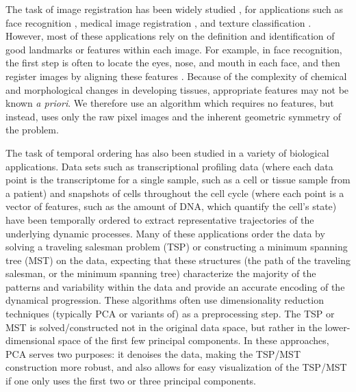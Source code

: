 \documentclass{pnastwo}
\begin{document}
\begin{article}
The task of image registration has been widely studied \cite{zitova2003image}, for applications such as face recognition \cite{rowley1998rotation}, medical image registration \cite{hajnal2010medical}, and texture classification \cite{greenspan1994rotation}.
%
However, most of these applications rely on the definition and identification of good landmarks or features within each image.
%
For example, in face recognition, the first step is often to locate the eyes, nose, and mouth in each face, and then register images by aligning these features \cite{zhao2003face}.
%
%
Because of the complexity of chemical and morphological changes in developing tissues, appropriate features may not be known {\it a priori}.
%
We therefore use an algorithm which requires no features, but instead, uses only the raw pixel images and the inherent geometric symmetry of the problem.
%
%
%

The task of temporal ordering has also been studied in a variety of biological applications.
%
Data sets such as transcriptional profiling data (where each data point is the transcriptome for a single sample, such as a cell or tissue sample from a patient) \cite{anavy2014blind, trapnell2014dynamics,gupta2008extracting, qiu2011discovering} and snapshots of cells throughout the cell cycle (where each point is a vector of features, such as the amount of DNA, which quantify the cell's state)  \cite{kafri2013dynamics} have been temporally ordered to extract representative trajectories of the underlying dynamic processes.
%
Many of these applications order the data by solving a traveling salesman problem (TSP) or constructing a minimum spanning tree (MST) on the data,
expecting that these structures (the path of the traveling salesman, or the minimum spanning tree) characterize the majority of the patterns and variability within the data and provide an accurate encoding of the dynamical progression.
%
These algorithms often use dimensionality reduction techniques (typically PCA or variants of) as a preprocessing step.
%
The TSP or MST is solved/constructed not in the original data space, but rather in the lower-dimensional space of the first few principal components.
%
In these approaches, PCA serves two purposes: it denoises the data, making the TSP/MST construction more robust, and also allows for easy visualization of the TSP/MST if one only uses the first two or three principal components.


\end{article}
\end{document}
